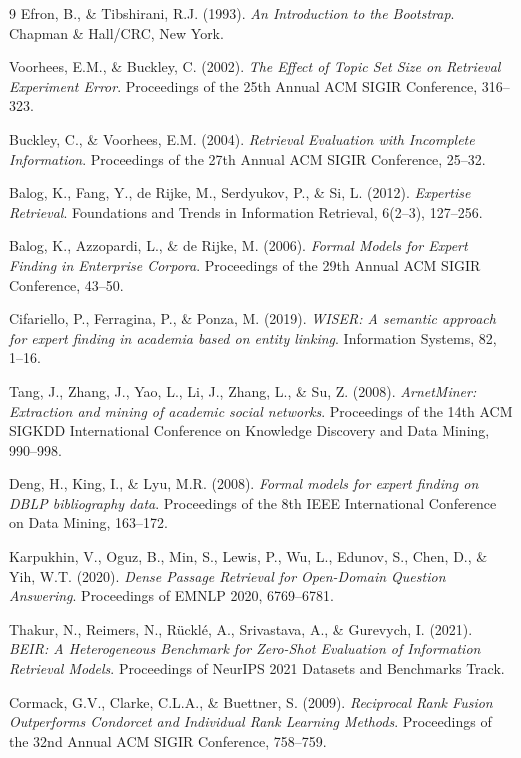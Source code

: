 \documentclass[11pt,a4paper]{article}
\begin{document}
\begin{thebibliography}{9}
Efron, B., \& Tibshirani, R.J. (1993).
\textit{An Introduction to the Bootstrap}.
Chapman \& Hall/CRC, New York.

Voorhees, E.M., \& Buckley, C. (2002).
\textit{The Effect of Topic Set Size on Retrieval Experiment Error}.
Proceedings of the 25th Annual ACM SIGIR Conference, 316--323.

Buckley, C., \& Voorhees, E.M. (2004).
\textit{Retrieval Evaluation with Incomplete Information}.
Proceedings of the 27th Annual ACM SIGIR Conference, 25--32.

Balog, K., Fang, Y., de Rijke, M., Serdyukov, P., \& Si, L. (2012).
\textit{Expertise Retrieval}.
Foundations and Trends in Information Retrieval, 6(2--3), 127--256.

Balog, K., Azzopardi, L., \& de Rijke, M. (2006).
\textit{Formal Models for Expert Finding in Enterprise Corpora}.
Proceedings of the 29th Annual ACM SIGIR Conference, 43--50.

Cifariello, P., Ferragina, P., \& Ponza, M. (2019).
\textit{WISER: A semantic approach for expert finding in academia based on
entity linking}.
Information Systems, 82, 1--16.

Tang, J., Zhang, J., Yao, L., Li, J., Zhang, L., \& Su, Z. (2008).
\textit{ArnetMiner: Extraction and mining of academic social networks}.
Proceedings of the 14th ACM SIGKDD International Conference on Knowledge
Discovery and Data Mining, 990--998.

Deng, H., King, I., \& Lyu, M.R. (2008).
\textit{Formal models for expert finding on DBLP bibliography data}.
Proceedings of the 8th IEEE International Conference on Data Mining, 163--172.

Karpukhin, V., Oguz, B., Min, S., Lewis, P., Wu, L., Edunov, S.,
Chen, D., \& Yih, W.T. (2020).
\textit{Dense Passage Retrieval for Open-Domain Question Answering}.
Proceedings of EMNLP 2020, 6769--6781.

Thakur, N., Reimers, N., R{\"u}ckl{\'e}, A., Srivastava, A., \&
Gurevych, I. (2021).
\textit{BEIR: A Heterogeneous Benchmark for Zero-Shot Evaluation of
Information Retrieval Models}.
Proceedings of NeurIPS 2021 Datasets and Benchmarks Track.

Cormack, G.V., Clarke, C.L.A., \& Buettner, S. (2009).
\textit{Reciprocal Rank Fusion Outperforms Condorcet and Individual Rank
Learning Methods}.
Proceedings of the 32nd Annual ACM SIGIR Conference, 758--759.


\end{thebibliography}
\end{document}
